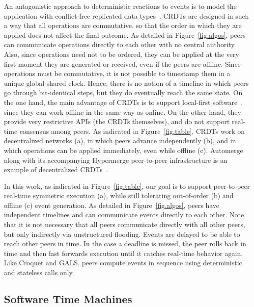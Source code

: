 \documentclass[fleqn,10pt]{SelfArx}
\begin{document}
An antagonistic approach to deterministic reactions to events is to model the
application with conflict-free replicated data types~\cite{crdts}.
CRDTs are designed in such a way that all operations are commutative, so that
the order in which they are applied does not affect the final outcome.
%
As detailed in Figure~\ref{fig.algos}, peers can communicate operations
directly to each other with no central authority.
Also, since operations need not to be ordered, they can be applied at the
very first moment they are generated or received, even if the peers are
offline.
%
Since operations must be commutative, it is not possible to timestamp them
in a unique global shared clock.
Hence, there is no notion of a timeline in which peers go through
bit-identical steps, but they do eventually reach the same state.
%
On the one hand, the main advantage of CRDTs is to support local-first
software~\cite{local}, since they can work offline in the same way as online.
On the other hand, they provide very restrictive APIs (the CRDTs themselves),
and do not support real-time consensus among peers.
%
As indicated in Figure~\ref{fig.table}, CRDTs work on decentralized networks
(a), in which peers advance independently (b), and in which operations can be
applied immediately, even while offline (c).
%
Automerge along with its accompanying Hypermerge peer-to-peer infrastructure
is an example of decentralized CRDTs~\cite{p2p.automerge,p2p.pushpin}.

In this work, as indicated in Figure~\ref{fig.table}, our goal is to support
peer-to-peer real-time symmetric execution (a), while still tolerating
out-of-order (b) and offline (c) event generation.
%
As detailed in Figure~\ref{fig.algos}, peers have independent timelines and
can communicate events directly to each other.
Note, that it is not necessary that all peers communicate directly with all
other peers, but only indirectly via unstructured flooding.
Events are delayed to be able to reach other peers in time.
In the case a deadline is missed, the peer rolls back in time and then fast
forwards execution until it catches real-time behavior again.
%
Like Croquet and GALS, peers compute events in sequence using deterministic and
stateless calls only.

\subsection{Software Time Machines}
\label{sec.related.time}

\end{document}
